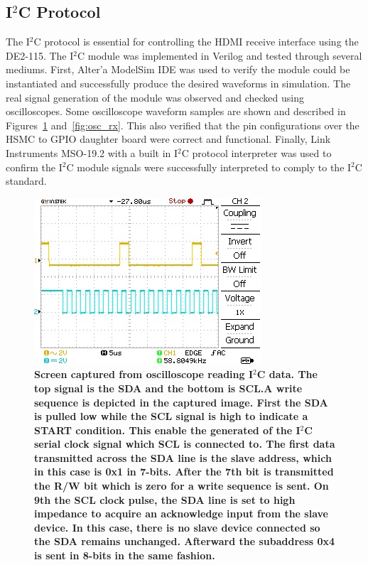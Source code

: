 \documentclass[pdftex,12pt,a4paper]{article}
\begin{document}
\subsection{I$^2$C Protocol}
The I$^2$C protocol is essential for controlling the HDMI receive interface using the DE2-115. The I$^2$C module was implemented in Verilog and tested through several mediums. First, Alter'a ModelSim IDE was used to verify the module could be instantiated and successfully produce the desired waveforms in simulation. The real signal generation of the module was observed and checked using oscilloscopes. Some oscilloscope waveform samples are shown and described in Figures~\ref{fig:osc_tx} and~\ref{fig:osc_rx}. This also verified that the pin configurations over the HSMC to GPIO daughter board were correct and functional. Finally, Link Instruments MSO-19.2 with a built in I$^2$C protocol interpreter was used to confirm the I$^2$C module signals were successfully interpreted to comply to the I$^2$C standard. 

\begin{figure}[H]
\centering
\includegraphics{osc_transmit.jpg}
\caption{\textbf{Screen captured from oscilloscope reading I$^2$C data. The top signal is the SDA and the bottom is SCL.A write sequence is depicted in the captured image. First the SDA is pulled low while the SCL signal is high to indicate a START condition. This enable the generated of the I$^2$C serial clock signal which SCL is connected to. The first data transmitted across the SDA line is the slave address, which in this case is 0x1 in 7-bits. After the 7th bit is transmitted the R/W bit which is zero for a write sequence is sent. On 9th the SCL clock pulse, the SDA line is set to high impedance to acquire an acknowledge input from the slave device. In this case, there is no slave device connected so the SDA remains unchanged. Afterward the subaddress 0x4 is sent in 8-bits in the same fashion. }}
\label{fig:osc_tx}
\end{figure}
\end{document}
